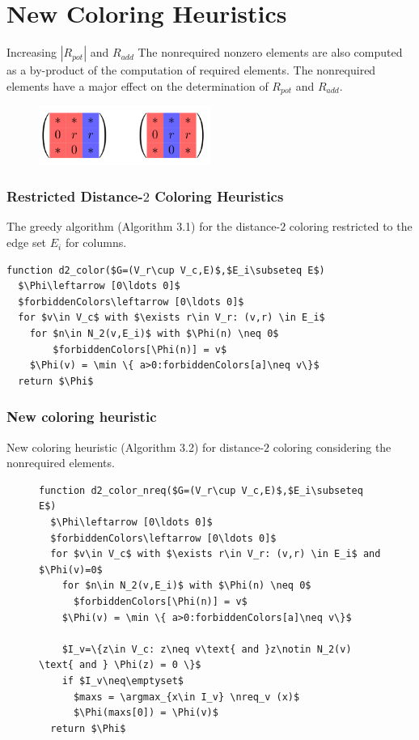 \documentclass{beamer}
\DeclareMathOperator*{\argmax}{arg\,max}
\newcommand{\nreq}{L}
\begin{document}
\section{New Coloring Heuristics}
\begin{frame}{Increasing $|R_{pot}|$ and $R_{add}$}
The nonrequired nonzero elements are also computed as a by-product of the computation of required elements.
The nonrequired elements have a major effect on the determination of $R_{pot}$ and $R_{add}$.
\begin{figure}
\centering
\includegraphics[width=0.5\textwidth]{increase}
\end{figure}
\end{frame}

\begin{frame}[fragile]
\frametitle{Restricted Distance-$2$ Coloring Heuristics}
{\color{green} The greedy algorithm (Algorithm 3.1)} for
the distance-$2$ coloring restricted to the edge set $E_i$
for columns.
\begin{lstlisting}[mathescape]
function d2_color($G=(V_r\cup V_c,E)$,$E_i\subseteq E$)
  $\Phi\leftarrow [0\ldots 0]$
  $forbiddenColors\leftarrow [0\ldots 0]$
  for $v\in V_c$ with $\exists r\in V_r: (v,r) \in E_i$
    for $n\in N_2(v,E_i)$ with $\Phi(n) \neq 0$
        $forbiddenColors[\Phi(n)] = v$
    $\Phi(v) = \min \{ a>0:forbiddenColors[a]\neq v\}$
  return $\Phi$
\end{lstlisting}
\end{frame}
\begin{frame}[fragile]
\frametitle{New coloring heuristic}
{\color{blue} New coloring heuristic (Algorithm 3.2)} for distance-$2$ coloring
considering the nonrequired elements.
\begin{figure}
\begin{lstlisting}[mathescape]
function d2_color_nreq($G=(V_r\cup V_c,E)$,$E_i\subseteq E$)
  $\Phi\leftarrow [0\ldots 0]$
  $forbiddenColors\leftarrow [0\ldots 0]$
  for $v\in V_c$ with $\exists r\in V_r: (v,r) \in E_i$ and $\Phi(v)=0$
    for $n\in N_2(v,E_i)$ with $\Phi(n) \neq 0$
      $forbiddenColors[\Phi(n)] = v$
    $\Phi(v) = \min \{ a>0:forbiddenColors[a]\neq v\}$

    $I_v=\{z\in V_c: z\neq v\text{ and }z\notin N_2(v) \text{ and } \Phi(z) = 0 \}$
    if $I_v\neq\emptyset$
      $maxs = \argmax_{x\in I_v} \nreq_v (x)$
      $\Phi(maxs[0]) = \Phi(v)$
  return $\Phi$
\end{lstlisting}
\end{figure}
\end{frame}
\end{document}
